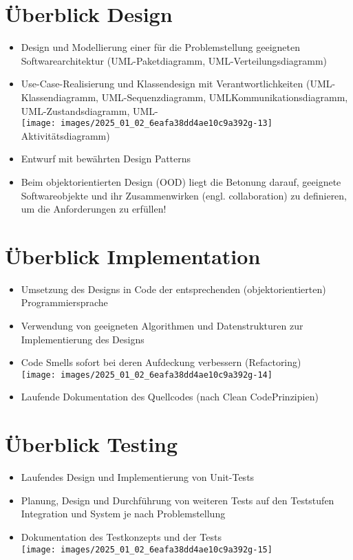 \documentclass[10pt]{article}
\begin{document}
\section*{Überblick Design}
\begin{itemize}
  \item Design und Modellierung einer für die Problemstellung geeigneten Softwarearchitektur (UML-Paketdiagramm, UML-Verteilungsdiagramm)
  \item Use-Case-Realisierung und Klassendesign mit Verantwortlichkeiten (UML-Klassendiagramm, UML-Sequenzdiagramm, UMLKommunikationsdiagramm, UML-Zustandsdiagramm, UML-\\
\texttt{[image: images/2025\_01\_02\_6eafa38dd4ae10c9a392g-13]} Aktivitätsdiagramm)
  \item Entwurf mit bewährten Design Patterns
  \item Beim objektorientierten Design (OOD) liegt die Betonung darauf, geeignete Softwareobjekte und ihr Zusammenwirken (engl. collaboration) zu definieren, um die Anforderungen zu erfüllen!
\end{itemize}

\section*{Überblick Implementation}
\begin{itemize}
  \item Umsetzung des Designs in Code der entsprechenden (objektorientierten) Programmiersprache
  \item Verwendung von geeigneten Algorithmen und Datenstrukturen zur Implementierung des Designs
  \item Code Smells sofort bei deren Aufdeckung verbessern (Refactoring)\\
\texttt{[image: images/2025\_01\_02\_6eafa38dd4ae10c9a392g-14]}
  \item Laufende Dokumentation des Quellcodes (nach Clean CodePrinzipien)
\end{itemize}

\section*{Überblick Testing}
\begin{itemize}
  \item Laufendes Design und Implementierung von Unit-Tests
  \item Planung, Design und Durchführung von weiteren Tests auf den Teststufen Integration und System je nach Problemstellung
  \item Dokumentation des Testkonzepts und der Tests\\
\texttt{[image: images/2025\_01\_02\_6eafa38dd4ae10c9a392g-15]}
\end{itemize}
\end{document}
